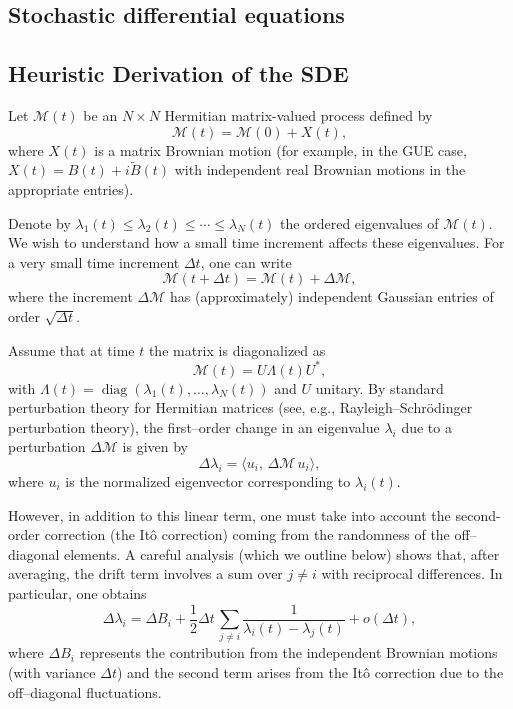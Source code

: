\documentclass[letterpaper,11pt,oneside,reqno]{article}
\numberwithin{equation}{section}
\theoremstyle{definition}
\begin{document}
\subsection{Stochastic differential equations}








\subsection{Heuristic Derivation of the SDE}

Let \(\mathcal{M}(t)\) be an \(N\times N\) Hermitian matrix-valued process defined by
\[
\mathcal{M}(t)=\mathcal{M}(0)+X(t),
\]
where \(X(t)\) is a matrix Brownian motion (for example, in the GUE case, \(X(t)=B(t)+i\tilde{B}(t)\) with independent real Brownian motions in the appropriate entries).

Denote by \(\lambda_1(t) \le \lambda_2(t) \le \cdots \le \lambda_N(t)\) the ordered eigenvalues of \(\mathcal{M}(t)\). We wish to understand how a small time increment affects these eigenvalues. For a very small time increment \(\Delta t\), one can write
\[
\mathcal{M}(t+\Delta t)=\mathcal{M}(t)+\Delta \mathcal{M},
\]
where the increment \(\Delta \mathcal{M}\) has (approximately) independent Gaussian entries of order \(\sqrt{\Delta t}\).

Assume that at time \(t\) the matrix is diagonalized as
\[
\mathcal{M}(t)=U \Lambda(t) U^*,
\]
with \(\Lambda(t)=\operatorname{diag}(\lambda_1(t),\dots,\lambda_N(t))\) and \(U\) unitary. By standard perturbation theory for Hermitian matrices (see, e.g., Rayleigh–Schrödinger perturbation theory), the first–order change in an eigenvalue \(\lambda_i\) due to a perturbation \(\Delta \mathcal{M}\) is given by
\[
\Delta\lambda_i = \langle u_i,\,\Delta \mathcal{M}\,u_i \rangle,
\]
where \(u_i\) is the normalized eigenvector corresponding to \(\lambda_i(t)\).

However, in addition to this linear term, one must take into account the second-order correction (the Itô correction) coming from the randomness of the off–diagonal elements. A careful analysis (which we outline below) shows that, after averaging, the drift term involves a sum over \(j\neq i\) with reciprocal differences. In particular, one obtains
\[
\Delta\lambda_i = \Delta B_i + \frac{1}{2}\Delta t\,\sum_{j\neq i}\frac{1}{\lambda_i(t)-\lambda_j(t)} + o(\Delta t),
\]
where \(\Delta B_i\) represents the contribution from the independent Brownian motions (with variance \(\Delta t\)) and the second term arises from the Itô correction due to the off–diagonal fluctuations.
\end{document}

